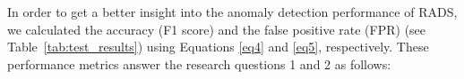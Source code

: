 In order to get a better insight into the anomaly detection performance of RADS, we calculated the accuracy (F1 score) and the false positive rate (FPR) (see Table~\ref{tab:test_results}) using Equations \ref{eq4} and \ref{eq5}, respectively.  
These performance metrics answer the research questions 1 and 2 as follows:
